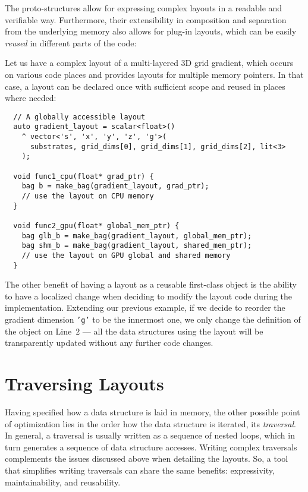 The proto-structures allow for expressing complex layouts in a readable and verifiable way. Furthermore, their extensibility in composition and separation from the underlying memory also allows for plug-in layouts, which can be easily \emph{reused} in different parts of the code:

Let us have a complex layout of a multi-layered 3D grid gradient, which occurs on various code places and provides layouts for multiple memory pointers. In that case, a layout can be declared once with sufficient scope and reused in places where needed:

\begin{verbatim}
  // A globally accessible layout
  auto gradient_layout = scalar<float>()
    ^ vector<'s', 'x', 'y', 'z', 'g'>(
      substrates, grid_dims[0], grid_dims[1], grid_dims[2], lit<3>
    );

  void func1_cpu(float* grad_ptr) {
    bag b = make_bag(gradient_layout, grad_ptr);
    // use the layout on CPU memory
  }

  void func2_gpu(float* global_mem_ptr) {
    bag glb_b = make_bag(gradient_layout, global_mem_ptr);
    bag shm_b = make_bag(gradient_layout, shared_mem_ptr);
    // use the layout on GPU global and shared memory
  }
\end{verbatim}

The other benefit of having a layout as a reusable first-class object is the ability to have a localized change when deciding to modify the layout code during the implementation. Extending our previous example, if we decide to reorder the gradient dimension \texttt{'g'} to be the innermost one, we only change the definition of the object on Line~$2$ --- all the data structures using the layout will be transparently updated without any further code changes.


\section{Traversing Layouts}
\label{sec:traversals}

Having specified how a data structure is laid in memory, the other possible point of optimization lies in the order how the data structure is iterated, its \emph{traversal}. In general, a traversal is usually written as a sequence of nested loops, which in turn generates a sequence of data structure accesses. Writing complex traversals complements the issues discussed above when detailing the layouts. So, a tool that simplifies writing traversals can share the same benefits: expressivity, maintainability, and reusability.

